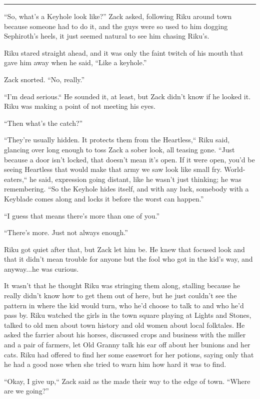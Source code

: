 \fancybreak{\pfbreakdisplay}


``So, what's a Keyhole look like?'' Zack asked, following Riku around town because someone had to do it, and the guys were so used to him dogging Sephiroth's heels, it just seemed natural to see him chasing Riku's.

Riku stared straight ahead, and it was only the faint twitch of his mouth that gave him away when he said, ``Like a keyhole.''

Zack snorted. ``No, really.''

``I'm dead serious.`` He sounded it, at least, but Zack didn't know if he looked it. Riku was making a point of not meeting his eyes.

``Then what's the catch?''

``They're usually hidden. It protects them from the Heartless,`` Riku said, glancing over long enough to toss Zack a sober look, all teasing gone. ``Just because a door isn't locked, that doesn't mean it's open. If it were open, you'd be seeing Heartless that would make that army we saw look like small fry. World-eaters,`` he said, expression going distant, like he wasn't just thinking; he was remembering. ``So the Keyhole hides itself, and with any luck, somebody with a Keyblade comes along and locks it before the worst can happen.''

``I guess that means there's more than one of you.''

``There's more. Just not always enough.''

Riku got quiet after that, but Zack let him be. He knew that focused look and that it didn't mean trouble for anyone but the fool who got in the kid's way, and anyway...he was curious.

It wasn't that he thought Riku was stringing them along, stalling because he really didn't know how to get them out of here, but he just couldn't see the pattern in where the kid would turn, who he'd choose to talk to and who he'd pass by. Riku watched the girls in the town square playing at Lights and Stones, talked to old men about town history and old women about local folktales. He asked the farrier about his horses, discussed crops and business with the miller and a pair of farmers, let Old Granny talk his ear off about her bunions and her cats. Riku had offered to find her some easewort for her potions, saying only that he had a good nose when she tried to warn him how hard it was to find.

``Okay, I give up,`` Zack said as the made their way to the edge of town. ``Where are we going?''

